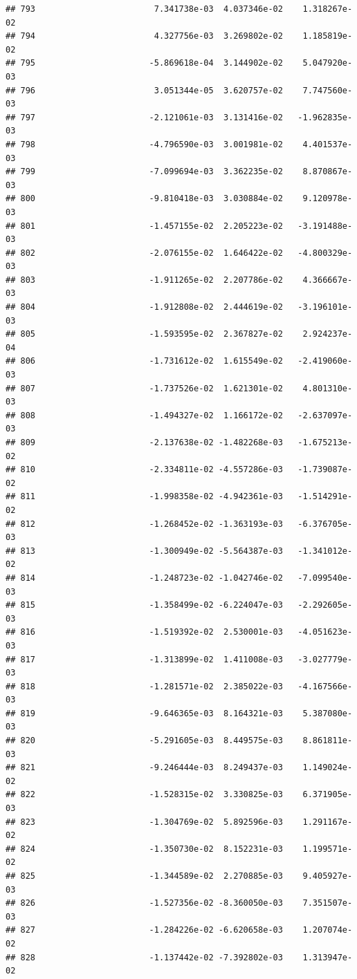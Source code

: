 \documentclass[
]{article}
\begin{document}
\begin{verbatim}
## 793                        7.341738e-03  4.037346e-02    1.318267e-02
## 794                        4.327756e-03  3.269802e-02    1.185819e-02
## 795                       -5.869618e-04  3.144902e-02    5.047920e-03
## 796                        3.051344e-05  3.620757e-02    7.747560e-03
## 797                       -2.121061e-03  3.131416e-02   -1.962835e-03
## 798                       -4.796590e-03  3.001981e-02    4.401537e-03
## 799                       -7.099694e-03  3.362235e-02    8.870867e-03
## 800                       -9.810418e-03  3.030884e-02    9.120978e-03
## 801                       -1.457155e-02  2.205223e-02   -3.191488e-03
## 802                       -2.076155e-02  1.646422e-02   -4.800329e-03
## 803                       -1.911265e-02  2.207786e-02    4.366667e-03
## 804                       -1.912808e-02  2.444619e-02   -3.196101e-03
## 805                       -1.593595e-02  2.367827e-02    2.924237e-04
## 806                       -1.731612e-02  1.615549e-02   -2.419060e-03
## 807                       -1.737526e-02  1.621301e-02    4.801310e-03
## 808                       -1.494327e-02  1.166172e-02   -2.637097e-03
## 809                       -2.137638e-02 -1.482268e-03   -1.675213e-02
## 810                       -2.334811e-02 -4.557286e-03   -1.739087e-02
## 811                       -1.998358e-02 -4.942361e-03   -1.514291e-02
## 812                       -1.268452e-02 -1.363193e-03   -6.376705e-03
## 813                       -1.300949e-02 -5.564387e-03   -1.341012e-02
## 814                       -1.248723e-02 -1.042746e-02   -7.099540e-03
## 815                       -1.358499e-02 -6.224047e-03   -2.292605e-03
## 816                       -1.519392e-02  2.530001e-03   -4.051623e-03
## 817                       -1.313899e-02  1.411008e-03   -3.027779e-03
## 818                       -1.281571e-02  2.385022e-03   -4.167566e-03
## 819                       -9.646365e-03  8.164321e-03    5.387080e-03
## 820                       -5.291605e-03  8.449575e-03    8.861811e-03
## 821                       -9.246444e-03  8.249437e-03    1.149024e-02
## 822                       -1.528315e-02  3.330825e-03    6.371905e-03
## 823                       -1.304769e-02  5.892596e-03    1.291167e-02
## 824                       -1.350730e-02  8.152231e-03    1.199571e-02
## 825                       -1.344589e-02  2.270885e-03    9.405927e-03
## 826                       -1.527356e-02 -8.360050e-03    7.351507e-03
## 827                       -1.284226e-02 -6.620658e-03    1.207074e-02
## 828                       -1.137442e-02 -7.392802e-03    1.313947e-02

\end{verbatim}
\end{document}
